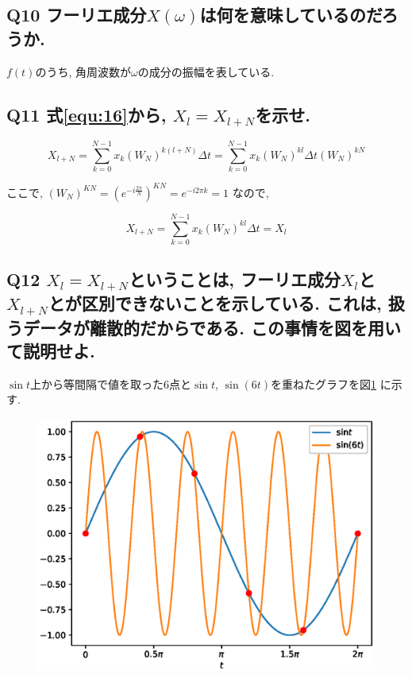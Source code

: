 \documentclass[titlepage]{jsarticle}
\begin{document}
    \subsection{Q10 フーリエ成分$X(\omega)$は何を意味しているのだろうか.}
        $f(t)$のうち, 角周波数が$\omega$の成分の振幅を表している.

    \subsection{Q11 式\ref{equ:16}から, $X_l=X_{l+N}$を示せ.}
        \begin{equation*}
            X_{l+N}=\sum_{k=0}^{N-1}x_k(W_N)^{k(l+N)}\Delta t
            =\sum_{k=0}^{N-1}x_k(W_N)^{kl}\Delta t(W_N)^{kN}
        \end{equation*}

        ここで,
        $(W_N)^{KN}=\left(e^{-i\frac{2\pi}{N}}\right)^{KN}=e^{-i2\pi k}=1$
        なので,

        \begin{equation*}
            X_{l+N}=\sum_{k=0}^{N-1}x_k(W_N)^{kl}\Delta t=X_l
        \end{equation*}

    \subsection{Q12 $X_l=X_{l+N}$ということは,
        フーリエ成分$X_l$と$X_{l+N}$とが区別できないことを示している.
        これは, 扱うデータが離散的だからである. この事情を図を用いて説明せよ.}

        $\sin t$上から等間隔で値を取った6点と$\sin t$, $\sin(6t)$を重ねたグラフを図\ref{fig:12}
        に示す.

        \begin{figure}[h]
            \centering
            \includegraphics[width=0.8\hsize]{img/12.eps}
            \caption{}
            \label{fig:12}
        \end{figure}
\end{document}
